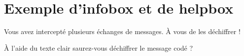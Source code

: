 \documentclass{article}
\begin{document}
	
	\section*{Exemple d'infobox et de helpbox}
	
	\begin{infobox}
		Vous avez intercepté plusieurs échanges de messages. À vous de les déchiffrer !
	\end{infobox}
	
	\begin{helpbox}
		À l’aide du texte clair saurez-vous déchiffrer le message codé ?
	\end{helpbox}
	
\end{document}
